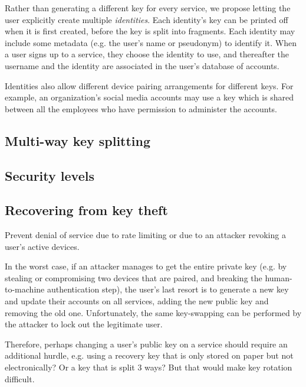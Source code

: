 Rather than generating a different key for every service, we propose letting the user explicitly
create multiple \emph{identities}. Each identity's key can be printed off when it is first created,
before the key is split into fragments. Each identity may include some metadata (e.g. the user's
name or pseudonym) to identify it. When a user signs up to a service, they choose the identity to
use, and thereafter the username and the identity are associated in the user's database of accounts.

Identities also allow different device pairing arrangements for different keys. For example, an
organization's social media accounts may use a key which is shared between all the employees who
have permission to administer the accounts.

\subsection{Multi-way key splitting}
\subsection{Security levels}




\subsection{Recovering from key theft}

Prevent denial of service due to rate limiting or due to an attacker revoking a user's active
devices.

In the worst case, if an attacker manages to get the entire private key (e.g. by stealing or
compromising two devices that are paired, and breaking the human-to-machine authentication step),
the user's last resort is to generate a new key and update their accounts on all services, adding
the new public key and removing the old one. Unfortunately, the same key-swapping can be performed
by the attacker to lock out the legitimate user.

Therefore, perhaps changing a user's public key on a service should require an additional hurdle,
e.g. using a recovery key that is only stored on paper but not electronically? Or a key that is
split 3 ways? But that would make key rotation difficult.
